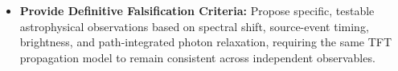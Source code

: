 \begin{itemize}
    \item \textbf{Provide Definitive Falsification Criteria:} Propose specific, testable astrophysical observations based on spectral shift, source-event timing, brightness, and path-integrated photon relaxation, requiring the same TFT propagation model to remain consistent across independent observables.

\end{itemize}